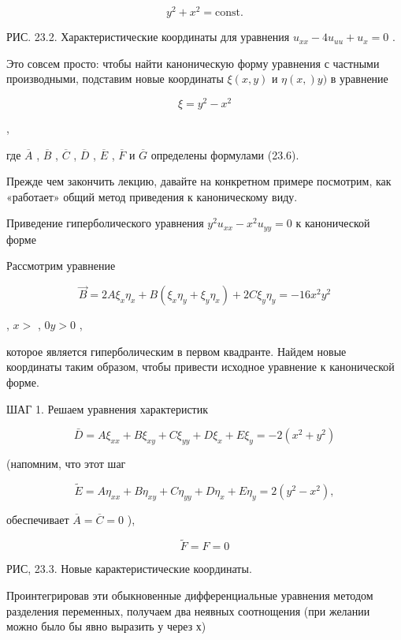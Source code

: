 \documentclass[
  ukrainian,
]{article}
\begin{document}
\[
y^2 + x^2 = \text{const}.
\]

РИС. 23.2. Характеристические координаты для уравнения
\(u_{xx} - 4u_{uu} + u_x = 0\) .

Это совсем просто: чтобы найти каноническую форму уравнения с частными
производными, подставим новые координаты \(\xi(x, y)\) и \(\eta(x,) y)\)
в уравнение

\[
\xi = y^2 - x^2
\]

,

где \(\overline{A}\) , \(\overline{B}\) , \(\overline{C}\) ,
\(\overline{D}\) , \(\overline{E}\) , \(\overline{F}\) и
\(\overline{G}\) определены формулами (23.6).

Прежде чем закончить лекцию, давайте на конкретном примере посмотрим,
как «работает» общий метод приведения к каноническому виду.

Приведение гиперболического уравнения \(y^2u_{xx}-x^2u_{yy}=0\) к
канонической форме

Рассмотрим уравнение

\[
\vec{B} = 2A\xi_x\eta_x + B(\xi_x\eta_y + \xi_y\eta_x) + 2C\xi_y\eta_y = -16x^2y^2
\]

, \(x>\) , \(0 y>0\) ,

которое является гиперболическим в первом квадранте. Найдем новые
координаты таким образом, чтобы привести исходное уравнение к
канонической форме.

ШАГ 1. Решаем уравнения характеристик

\[
\bar{D} = A\xi_{xx} + B\xi_{xy} + C\xi_{yy} + D\xi_x + E\xi_y = -2(x^2 + y^2)
\]

(напомним, что этот шаг

\[
\widetilde{E} = A\eta_{xx} + B\eta_{xy} + C\eta_{yy} + D\eta_x + E\eta_y = 2(y^2 - x^2),
\]

обеспечивает \(\overline{A} = \overline{C} = 0\) ),

\[
\tilde{F} = F = 0
\]

РИС, 23.3. Новые карактеристические координаты.

Проинтегрировав эти обыкновенные дифференциальные уравнения методом
разделения переменных, получаем два неявных соотнощения (при желании
можно было бы явно выразить у через х)
\end{document}
